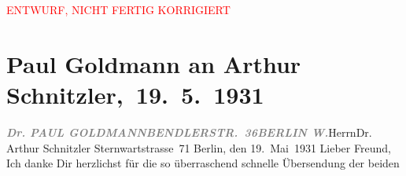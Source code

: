 
\begin{center}
            \textcolor{red}{ENTWURF, NICHT FERTIG KORRIGIERT}
                      \end{center}
            
         \renewcommand{\erwaehnteInstitutionen}{Institutionen: S. Fischer Verlag}
         \renewcommand{\erwaehnteOrte}{Orte: Bendlerstraße, Berlin, Semmering, Sternwartestraße 71, Wien}
         \renewcommand{\erwaehnteWerke}{Werke: ?? [Roman mit erotischen Schilderungen], Im Spiel der Sommerlüfte. In drei Aufzügen}
               \section[ Paul Goldmann an Arthur Schnitzler, 19. 5. 1931]{ Paul Goldmann an Arthur Schnitzler, 19. 5. 1931}\nopagebreak{}\rehead{ }\begin{ledgroupsized}[t]{13cm}\normalsize\beginnumbering \toendnotes[C]{\smallbreak\pagebreak[2]} 
\toendnotes[C]{\smallbreak}\pstart{}\textcolor{gray}{\textbf{\textit{{\pb}Dr. PAUL GOLDMANN}}}\pend{}\pstart{}\textcolor{gray}{\textbf{\textit{BENDLERSTR. 36}}}\pend{}\pstart{}\textcolor{gray}{\textbf{\textit{BERLIN W.}}}\pend{}{\bigskip}\pstart{}Herrn\pend{}\pstart{}Dr. Arthur Schnitzler\pend{}\pstart{}\pend{}\pstart{}\label{T_L03517-1v}\label{T_L03517-1h}
                     Sternwartstrasse 71\pend{}{\bigskip}\pstart
           \centering{}{\pb}Berlin, den 19. Mai 1931\pend
           \pstart{}Lieber Freund,\pend\pstart
           Ich danke Dir herzlichst für die so überraschend schnelle Übersendung der beiden

\end{ledgroupsized}
